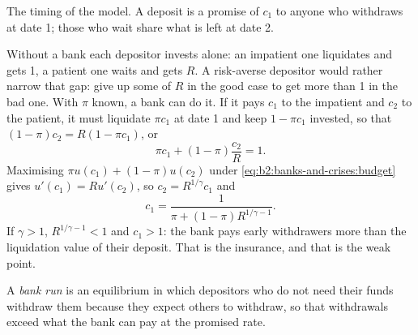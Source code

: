 \begin{omfigure}

{\small The timing of the model. A deposit is a promise of $c_1$ to anyone who withdraws at date 1; those who wait share
what is left at date 2.}
\end{omfigure}

Without a bank each depositor invests alone: an impatient one liquidates and gets 1, a patient one waits and gets $R$. A
risk-averse depositor would rather narrow that gap: give up some of $R$ in the good case to get more than 1 in the bad
one. With $\pi$ known, a bank can do it. If it pays $c_1$ to the impatient and $c_2$ to the patient, it must liquidate
$\pi c_1$ at date 1 and keep $1 - \pi c_1$ invested, so that $(1 - \pi)c_2 = R(1 - \pi c_1)$, or
\begin{equation}\label{eq:b2:banks-and-crises:budget}
\pi c_1 + (1 - \pi)\frac{c_2}{R} = 1.
\end{equation}
Maximising $\pi u(c_1) + (1 - \pi)u(c_2)$ under \eqref{eq:b2:banks-and-crises:budget} gives $u'(c_1) = Ru'(c_2)$, so
$c_2 = R^{1/\gamma}c_1$ and
\begin{equation}\label{eq:b2:banks-and-crises:contract}
c_1 = \frac{1}{\pi + (1 - \pi)R^{1/\gamma - 1}}.
\end{equation}
If $\gamma > 1$, $R^{1/\gamma - 1} < 1$ and $c_1 > 1$: the bank pays early withdrawers more than the liquidation value of
their deposit. That is the insurance, and that is the weak point.

\begin{definition}\label{def:b2:banks-and-crises:bank-run}
A \emph{bank run} is an equilibrium in which depositors who do not need their funds withdraw them because
they expect others to withdraw, so that withdrawals exceed what the bank can pay at the promised rate.
\end{definition}

